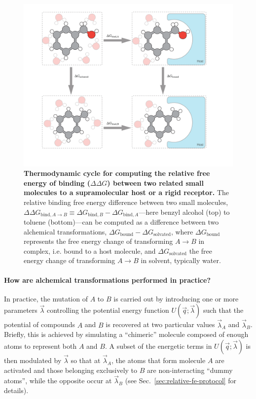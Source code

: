 \documentclass[9pt,bestpractices]{livecoms}
\begin{document}
\begin{figure}
    \includegraphics[width=0.95\linewidth]{figures/fig2_therm_cyc/Figure.pdf}
    \caption{{\bf Thermodynamic cycle for computing the relative free energy of binding ($\Delta \Delta G$) between two related small molecules to a supramolecular host or a rigid receptor.}
    The relative binding free energy difference between two small molecules, $\Delta \Delta G_{\mathrm{bind}, A \rightarrow B} \equiv \Delta G_{\mathrm{bind}, B} - \Delta G_{\mathrm{bind}, A}$---here benzyl alcohol (top) to toluene (bottom)---can be computed as a difference between two alchemical transformations, $\Delta G_\mathrm{bound} - \Delta G_\mathrm{solvated}$, where $\Delta G_\mathrm{bound}$ represents the free energy change of transforming $A \rightarrow B$ in complex, i.e. bound to a host molecule, and $\Delta G_\mathrm{solvated}$ the free energy change of transforming $A \rightarrow B$ in solvent, typically water.}
    \label{fig:fig_binding_thermodynamic_cycle}
\end{figure}

\paragraph{How are alchemical transformations performed in practice?}

In practice, the mutation of $A$ to $B$ is carried out by introducing one or more parameters $\vec{\lambda}$ controlling the potential energy function $U(\vec{q};\vec{\lambda})$ such that the potential of compounds $A$ and $B$ is recovered at two particular values $\vec{\lambda}_A$ and $\vec{\lambda}_B$.
Briefly, this is achieved by simulating a ``chimeric'' molecule composed of enough atoms to represent both $A$ and $B$.
A subset of the energetic terms in $U(\vec{q};\vec{\lambda})$ is then modulated by $\vec{\lambda}$ so that at $\vec{\lambda}_A$, the atoms that form molecule $A$ are activated and those belonging exclusively to $B$ are non-interacting ``dummy atoms'', while the opposite occur at $\vec{\lambda}_B$ (see Sec.~\ref{sec:relative-fe-protocol} for details).
\end{document}
